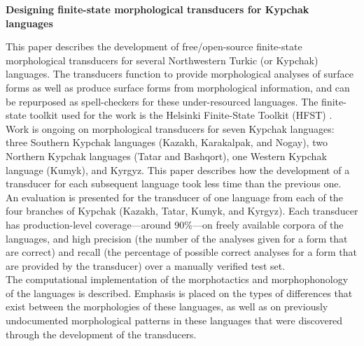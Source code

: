 \documentclass[letterpaper,11pt,onecolumn]{article}
\begin{document}
\thispagestyle{empty}

\begin{center}
	\textbf{Designing finite-state morphological transducers for Kypchak languages}
\end{center}

This paper describes the development of free/open-source finite-state morphological transducers for several Northwestern Turkic (or Kypchak) languages.  The transducers function to provide morphological analyses of surface forms as well as produce surface forms from morphological information, and can be repurposed as spell-checkers for these under-resourced languages.  The finite-state toolkit used for the work is the Helsinki Finite-State Toolkit (HFST) \citep{hfst/2011}.\\

Work is ongoing on morphological transducers for seven Kypchak languages: three Southern Kypchak languages (Kazakh, Karakalpak, and Nogay), two Northern Kypchak languages (Tatar and Bashqort), one Western Kypchak language (Kumyk), and Kyrgyz.  This paper describes how the development of a transducer for each subsequent language took less time than the previous one.\\

An evaluation is presented for the transducer of one language from each of the four branches of Kypchak (Kazakh, Tatar, Kumyk, and Kyrgyz).  Each transducer has production-level coverage---around 90\%---on freely available corpora of the languages, and high precision (the number of the analyses given for a form that are correct) and recall (the percentage of possible correct analyses for a form that are provided by the transducer) over a manually verified test set.\\

The computational implementation of the morphotactics and morphophonology of the languages is described.  Emphasis is placed on the types of differences that exist between the morphologies of these languages, as well as on previously undocumented morphological patterns in these languages that were discovered through the development of the transducers.




\end{document}
